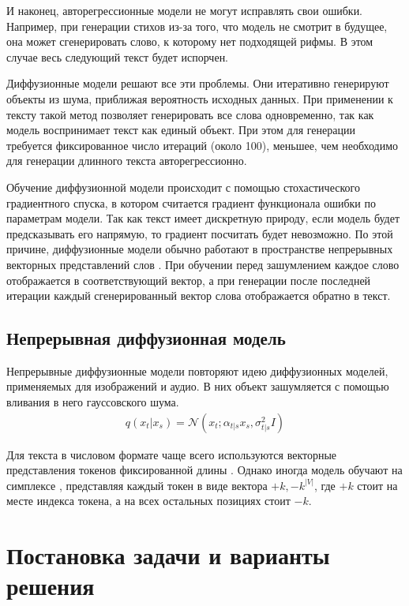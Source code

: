 \documentclass[12pt,a4paper]{article}
\begin{document}
И наконец, авторегрессионные модели не могут исправлять свои ошибки. Например, при генерации стихов из-за того, что модель не смотрит в будущее, она может сгенерировать слово, к которому нет подходящей рифмы. В этом случае весь следующий текст будет испорчен.


Диффузионные модели решают все эти проблемы. Они итеративно генерируют объекты из шума, приближая вероятность исходных данных. При применении к тексту такой метод позволяет генерировать все слова одновременно, так как модель воспринимает текст как единый объект. При этом для генерации требуется фиксированное число итераций (около 100), меньшее, чем необходимо для генерации длинного текста авторегрессионно.

Обучение диффузионной модели происходит с помощью стохастического градиентного спуска, в котором считается градиент функционала ошибки по параметрам модели. Так как текст имеет дискретную природу, если модель будет предсказывать его напрямую, то градиент посчитать будет невозможно. По этой причине, диффузионные модели обычно работают в пространстве непрерывных векторных представлений слов \cite{li2022diffusion, chen2022analog}. При обучении  перед зашумлением каждое слово отображается в соответствующий вектор, а при генерации после последней итерации каждый сгенерированный вектор слова отображается обратно в текст.


\subsection{Непрерывная диффузионная модель}
Непрерывные диффузионные модели повторяют идею диффузионных моделей, применяемых для изображений и аудио. В них объект зашумляется с помощью вливания в него гауссовского шума.
\begin{align}
    q(x_t | x_s) = \mathcal{N}(x_t; \alpha_{t|s} x_{s}, \sigma_{t|s}^2 I)
\end{align}

Для текста в числовом формате чаще всего используются векторные представления токенов фиксированной длины \cite{diffusionlm, diffuseq, yuan2022seqdiffseq, lin2023genie, planner, dinoiser, difformer}. Однако иногда модель обучают на симплексе \cite{han2023ssdlmsemiautoregressivesimplexbaseddiffusion, mahabadi2024tesstexttotextselfconditionedsimplex}, представляя каждый токен в виде вектора ${+k, -k}^{|V|}$, где $+k$ стоит на месте индекса токена, а на всех остальных позициях стоит $-k$.

\section{Постановка задачи и варианты решения}
\end{document}
